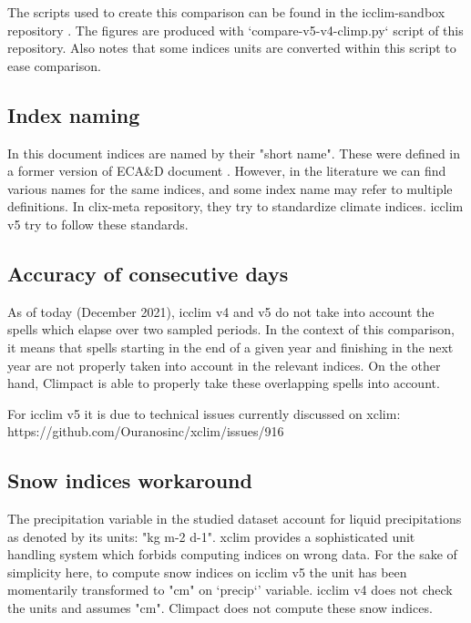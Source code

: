 \documentclass[a4paper,11pt]{article}
\begin{document}
        The scripts used to create this comparison can be found in the icclim-sandbox repository \cite{gh/icclim_sandbox}.
        The figures are produced with `compare-v5-v4-climp.py` script of this repository.
        Also notes that some indices units are converted within this script to ease comparison.

        \subsection{Index naming}
            In this document indices are named by their "short name". These were defined in a former version of ECA\&D document \cite{doc/ecad_old}.
            However, in the literature we can find various names for the same indices, and some index name may refer to multiple definitions. In clix-meta \cite{gh/clixmeta} repository, they try to standardize climate indices. 
            icclim v5 try to follow these standards.

        \subsection{Accuracy of consecutive days}
            As of today (December 2021), icclim v4 and v5 do not take into account the spells which elapse over two sampled periods. In the context of this comparison, it means that spells starting in the end of a given year and finishing in the next year are not properly taken into account in the relevant indices.
            On the other hand, Climpact is able to properly take these overlapping spells into account.

            For icclim v5 it is due to technical issues currently discussed on xclim: https://github.com/Ouranosinc/xclim/issues/916

        \subsection{Snow indices workaround}
            The precipitation variable in the studied dataset account for liquid precipitations as denoted by its units: "kg m-2 d-1".
            xclim provides a sophisticated unit handling system which forbids computing indices on wrong data. For the sake of simplicity here, to compute snow indices on icclim v5 the unit has been momentarily transformed to "cm" on `precip`' variable.
            icclim v4 does not check the units and assumes "cm".
            Climpact does not compute these snow indices.
            
\end{document}

